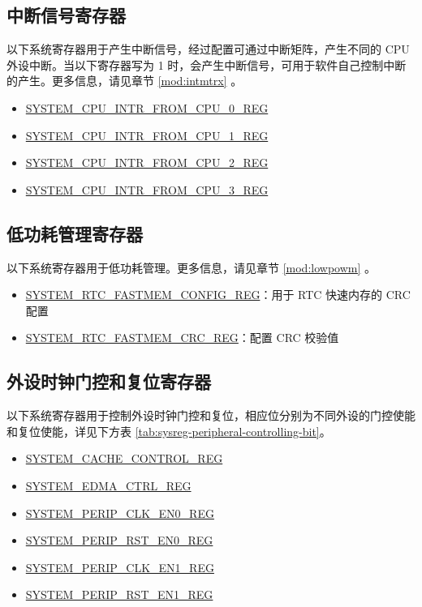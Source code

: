 \documentclass[main\_\_CN.tex]{subfiles}
\begin{document}
\subsection{中断信号寄存器}

以下系统寄存器用于产生中断信号，经过配置可通过中断矩阵，产生不同的 CPU 外设中断。当以下寄存器写为 1 时，会产生中断信号，可用于软件自己控制中断的产生。更多信息，请见章节 \ref{mod:intmtrx}
\textit{}。

\begin{itemize}
    \item \hyperref[fielddesc:SYSTEMCPUINTRFROMCPU0]{SYSTEM\_CPU\_INTR\_FROM\_CPU\_0\_REG}
    \item \hyperref[fielddesc:SYSTEMCPUINTRFROMCPU1]{SYSTEM\_CPU\_INTR\_FROM\_CPU\_1\_REG}
    \item \hyperref[fielddesc:SYSTEMCPUINTRFROMCPU2]{SYSTEM\_CPU\_INTR\_FROM\_CPU\_2\_REG}
    \item \hyperref[fielddesc:SYSTEMCPUINTRFROMCPU3]{SYSTEM\_CPU\_INTR\_FROM\_CPU\_3\_REG}
\end{itemize}

\subsection{低功耗管理寄存器}

以下系统寄存器用于低功耗管理。更多信息，请见章节 \ref{mod:lowpowm} \textit{}。
\begin{itemize}
    \item \hyperref[regdesc:SYSTEMRTCFASTMEMCONFIGREG]{SYSTEM\_RTC\_FASTMEM\_CONFIG\_REG}：用于 RTC 快速内存的 CRC 配置
    \item \hyperref[regdesc:SYSTEMRTCFASTMEMCRCREG]{SYSTEM\_RTC\_FASTMEM\_CRC\_REG}：配置 CRC 校验值
\end{itemize}

\subsection{外设时钟门控和复位寄存器}

以下系统寄存器用于控制外设时钟门控和复位，相应位分别为不同外设的门控使能和复位使能，详见下方表 \ref{tab:sysreg-peripheral-controlling-bit}。

\begin{itemize}
    \item \hyperref[regdesc:SYSTEMCACHECONTROLREG]{SYSTEM\_CACHE\_CONTROL\_REG}
    \item \hyperref[regdesc:SYSTEMEDMACTRLREG]{SYSTEM\_EDMA\_CTRL\_REG}
    \item \hyperref[regdesc:SYSTEMPERIPCLKEN0REG]{SYSTEM\_PERIP\_CLK\_EN0\_REG}
    \item \hyperref[regdesc:SYSTEMPERIPRSTEN0REG]{SYSTEM\_PERIP\_RST\_EN0\_REG}
    \item \hyperref[regdesc:SYSTEMPERIPCLKEN1REG]{SYSTEM\_PERIP\_CLK\_EN1\_REG}
    \item \hyperref[regdesc:SYSTEMPERIPRSTEN1REG]{SYSTEM\_PERIP\_RST\_EN1\_REG}

\end{itemize}
\end{document}

